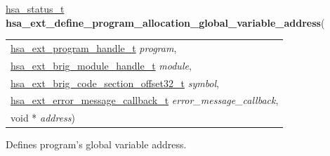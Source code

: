 \documentclass[final]{book}
\newcommand{\hsaarg}[1]{\textit{#1}}
\begin{document}
\noindent\begin{tcolorbox}[breakable,nobeforeafter,colframe=white,colback=lightgray,left=0mm]
\hyperlink{group__status_1gad755322e7ff95456520e8abdbe90d225}{hsa_status_t} \hypertarget{group__HsailLinkerServiceLayer_1ga5eb7c1222b4fe1625d358a17d123f923}{\textbf{hsa_ext_define_program_allocation_global_variable_address}}(
\vspace{-3.5mm}\begin{longtable}{@{}p{\textwidth}}
\hspace{1.7em}\hyperlink{group__HsailLinkerServiceLayer_1gaea8d90863414407ddba7e318db7412f9}{hsa_ext_program_handle_t} \hsaarg{program},\\
\hspace{1.7em}\hyperlink{group__FinalizerCoreApi_1ga0216996f5341a8591ecf9e0f6fd1b7e5}{hsa_ext_brig_module_handle_t} \hsaarg{module},\\
\hspace{1.7em}\hyperlink{group__FinalizerCoreApi_1ga494b8ac14a8c10af95b83b51a8a4ad7f}{hsa_ext_brig_code_section_offset32_t} \hsaarg{symbol},\\
\hspace{1.7em}\hyperlink{group__FinalizerCoreApi_1gace3d3971c5289675c4f88ce0045db41f}{hsa_ext_error_message_callback_t} \hsaarg{error_message_callback},\\
\hspace{1.7em}void * \hsaarg{address})\end{longtable}

\end{tcolorbox}
Defines program's global variable address.
\end{document}
